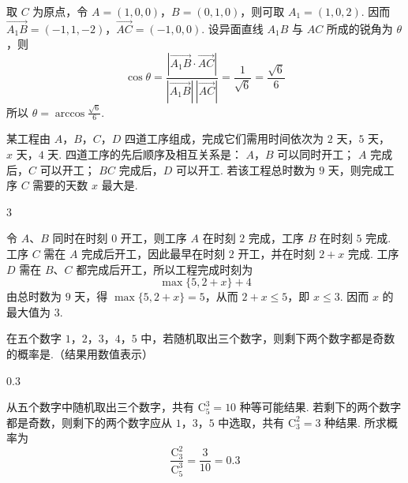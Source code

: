 \begin{solution}
取 \(C\) 为原点，令 \(A=(1,0,0)\)，\(B=(0,1,0)\)，则可取 \(A_{1}=(1,0,2)\). 因而 \(\overrightarrow{A_{1}B}=(-1,1,-2)\)，\(\overrightarrow{AC}=(-1,0,0)\).
设异面直线 \(A_{1}B\) 与 \(AC\) 所成的锐角为 \(\theta\)，则
\[
\cos\theta=\frac{\left|\overrightarrow{A_{1}B}\cdot\overrightarrow{AC}\right|}{|\overrightarrow{A_{1}B}|\,|\overrightarrow{AC}|}=\frac{1}{\sqrt{6}}=\frac{\sqrt{6}}{6}
\]
所以 \(\theta=\arccos\frac{\sqrt{6}}{6}\).
\end{solution}

\begin{problem}
某工程由 \(A\)，\(B\)，\(C\)，\(D\) 四道工序组成，完成它们需用时间依次为 \(2\text{ 天}\)，\(5\text{ 天}\)，\(x\text{ 天}\)，\(4\text{ 天}\). 四道工序的先后顺序及相互关系是： \(A\)，\(B\) 可以同时开工； \(A\) 完成后，\(C\) 可以开工； \(BC\) 完成后，\(D\) 可以开工. 若该工程总时数为 \(9\) 天，则完成工序 \(C\) 需要的天数 \(x\) 最大是\fillinblank{}.
\end{problem}

\begin{answer}
\(3\)
\end{answer}

\begin{solution}
令 \(A\)、\(B\) 同时在时刻 \(0\) 开工，则工序 \(A\) 在时刻 \(2\) 完成，工序 \(B\) 在时刻 \(5\) 完成. 工序 \(C\) 需在 \(A\) 完成后开工，因此最早在时刻 \(2\) 开工，并在时刻 \(2+x\) 完成. 工序 \(D\) 需在 \(B\)、\(C\) 都完成后开工，所以工程完成时刻为
\[
\max\{5,2+x\}+4
\]
由总时数为 \(9\) 天，得 \(\max\{5,2+x\}=5\)，从而 \(2+x\leqslant5\)，即 \(x\leqslant3\). 因而 \(x\) 的最大值为 \(3\).
\end{solution}

\begin{problem}
在五个数字 \(1\)，\(2\)，\(3\)，\(4\)，\(5\) 中，若随机取出三个数字，则剩下两个数字都是奇数的概率是\fillinblank{}.（结果用数值表示）
\end{problem}

\begin{answer}
\(0.3\)
\end{answer}

\begin{solution}
从五个数字中随机取出三个数字，共有 \(\mathrm C_5^3=10\) 种等可能结果. 若剩下的两个数字都是奇数，则剩下的两个数字应从 \(1\)，\(3\)，\(5\) 中选取，共有 \(\mathrm C_3^2=3\) 种结果. 所求概率为
\[
\frac{\mathrm C_3^2}{\mathrm C_5^3}=\frac{3}{10}=0.3
\]
\end{solution}

